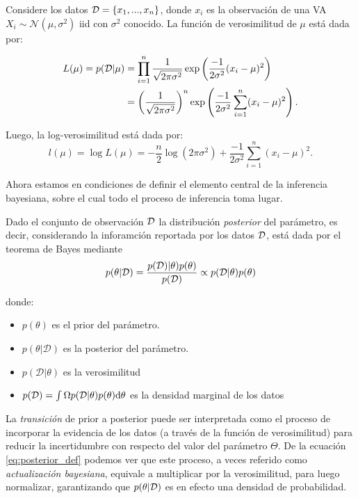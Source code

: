 \begin{example}
Considere los datos ${\mathcal D} = \{x_1,...,x_n\}$, donde $x_i$ es la observación de una VA $X_i\sim \mathcal{N}(\mu,\sigma^2)$ iid con $\sigma^2$ conocido. La función  de verosimilitud de $\mu$ está dada por:

\begin{align}
L(\mu)=p({\mathcal D}|\mu)&=\prod_{i=1}^{n} \frac{1}{\sqrt{2 \pi \sigma^{2}}} 
\exp\left(\frac{-1}{2\sigma^{2}}(x_i-\mu)^{2}\right)\nonumber\\
&= \left(\frac{1}{\sqrt{2 \pi \sigma^{2}}}\right)^{n} \exp\left(\frac{-1}{2 \sigma^{2}} \sum_{i=1}^{n} (x_i - \mu )^{2}\right).
\end{align}

Luego, la log-verosimilitud está dada por:
\begin{equation}
    l(\mu)= \log L(\mu) = -\frac{n}{2} \log(2 \pi \sigma^{2}) + \frac{-1}{2\sigma^{2}} \sum_{i=1}^{n} (x_i - \mu )^{2}.
\end{equation}

\end{example}

Ahora estamos en condiciones de definir el elemento central de la inferencia bayesiana, sobre el cual todo el proceso de inferencia toma lugar. 

\begin{definition}
\label{dist_posterior}
Dado el conjunto de observación ${\mathcal D}$ la distribución \emph{posterior} del parámetro, es decir, considerando la inforamción reportada por los datos ${\mathcal D}$, está dada por el teorema de Bayes mediante
\begin{align}
    p(\theta|{\mathcal D}) = \frac{p({\mathcal D})|\theta)p(\theta)}{p({\mathcal D})}  \propto p(\mathcal{D}|\theta) p(\theta) \label{eq:posterior_def}
\end{align}

donde: 
\begin{itemize}
    \item $p(\theta)$ es el prior del parámetro.
    \item $p(\theta|\mathcal{D})$ es la posterior del parámetro. 
    \item $p(\mathcal{D}|\theta)$ es la verosimilitud
    \item $p(\mathcal{D}) = \int\Omega p(\mathcal{D}|\theta)p(\theta){\text{d}} \theta $ es la densidad marginal de los datos 
\end{itemize}
\end{definition}

La \emph{transición} de prior a posterior puede ser interpretada como el proceso de incorporar la evidencia de los datos (a través de la función de verosimilitud) para reducir la incertidumbre con respecto del valor del parámetro $\Theta$. De la ecuación \eqref{eq:posterior_def} podemos ver que este proceso, a veces referido como \emph{actualización bayesiana}, equivale a multiplicar por la verosimilitud, para luego normalizar, garantizando que $p(\theta|{\mathcal D})$ es en efecto una densidad de probabilidad. 

